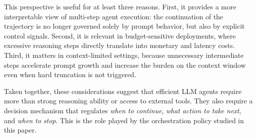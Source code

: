 This perspective is useful for at least three reasons. First, it provides a more interpretable view of multi-step agent execution: the continuation of the trajectory is no longer governed solely by prompt behavior, but also by explicit control signals. Second, it is relevant in budget-sensitive deployments, where excessive reasoning steps directly translate into monetary and latency costs. Third, it matters in context-limited settings, because unnecessary intermediate steps accelerate prompt growth and increase the burden on the context window even when hard truncation is not triggered.

Taken together, these considerations suggest that efficient LLM agents require more than strong reasoning ability or access to external tools. They also require a decision mechanism that regulates \emph{when to continue}, \emph{what action to take next}, and \emph{when to stop}. This is the role played by the orchestration policy studied in this paper.